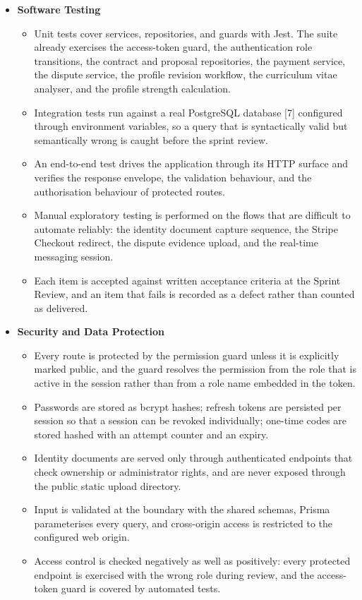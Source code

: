 \begin{itemize}
    \item \textbf{Software Testing}
    \begin{itemize}
        \item Unit tests cover services, repositories, and guards with Jest. The suite already exercises the access-token guard, the authentication role transitions, the contract and proposal repositories, the payment service, the dispute service, the profile revision workflow, the curriculum vitae analyser, and the profile strength calculation.
        \item Integration tests run against a real PostgreSQL database [7] configured through environment variables, so a query that is syntactically valid but semantically wrong is caught before the sprint review.
        \item An end-to-end test drives the application through its HTTP surface and verifies the response envelope, the validation behaviour, and the authorisation behaviour of protected routes.
        \item Manual exploratory testing is performed on the flows that are difficult to automate reliably: the identity document capture sequence, the Stripe Checkout redirect, the dispute evidence upload, and the real-time messaging session.
        \item Each item is accepted against written acceptance criteria at the Sprint Review, and an item that fails is recorded as a defect rather than counted as delivered.
    \end{itemize}

    \item \textbf{Security and Data Protection}
    \begin{itemize}
        \item Every route is protected by the permission guard unless it is explicitly marked public, and the guard resolves the permission from the role that is active in the session rather than from a role name embedded in the token.
        \item Passwords are stored as bcrypt hashes; refresh tokens are persisted per session so that a session can be revoked individually; one-time codes are stored hashed with an attempt counter and an expiry.
        \item Identity documents are served only through authenticated endpoints that check ownership or administrator rights, and are never exposed through the public static upload directory.
        \item Input is validated at the boundary with the shared schemas, Prisma parameterises every query, and cross-origin access is restricted to the configured web origin.
        \item Access control is checked negatively as well as positively: every protected endpoint is exercised with the wrong role during review, and the access-token guard is covered by automated tests.
    \end{itemize}


\end{itemize}
